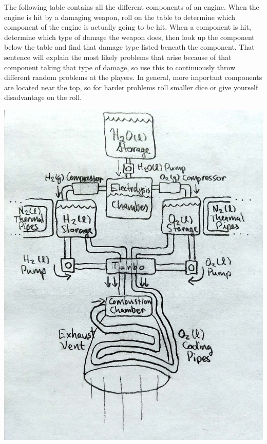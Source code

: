 \documentclass[a4paper]{article}
\begin{document}
The following table contains all the different components of an engine. When the engine is hit by a damaging weapon, roll on the table to determine which component of the engine is actually going to be hit. When a component is hit, determine which type of damage the weapon does, then look up the component below the table and find that damage type listed beneath the component. That sentence will explain the most likely problems that arise because of that component taking that type of damage, so use this to continuously throw different random problems at the players. In general, more important components are located near the top, so for harder problems roll smaller dice or give yourself disadvantage on the roll.

\vspace{0.2cm}
\includegraphics[scale=0.35]{Engine}
\end{document}
